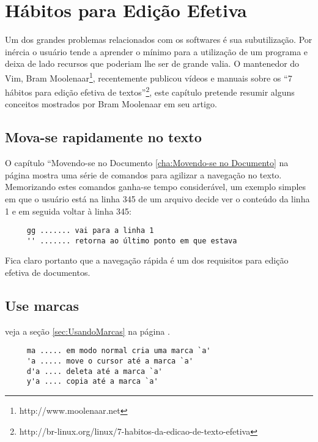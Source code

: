 
\chapter{Hábitos para Edição Efetiva}
\label{cha:Hábitos para edição efetiva}

Um dos grandes problemas relacionados com os softwares é sua subutilização. Por
inércia o usuário tende a aprender o mínimo para a utilização de um programa e
deixa de lado recursos que poderiam lhe ser de grande valia. O mantenedor do
Vim, Bram Moolenaar\footnote{http://www.moolenaar.net}, recentemente publicou
vídeos e manuais sobre os ``7 hábitos para edição efetiva de
textos''\footnote{http://br-linux.org/linux/7-habitos-da-edicao-de-texto-efetiva},
este capítulo pretende resumir alguns conceitos mostrados por Bram Moolenaar em
seu artigo.

\section{Mova-se rapidamente no texto}
\label{sec:Mova-se rapidamente no texto}

O capítulo ``Movendo-se no Documento \ref{cha:Movendo-se no Documento} na
página \pageref{cha:Movendo-se no Documento} mostra uma série de comandos para
agilizar a navegação no texto. Memorizando estes comandos ganha-se tempo
considerável, um exemplo simples em que o usuário está na linha 345 de um arquivo
decide ver o conteúdo da linha 1 e em seguida voltar à linha 345:

\begin{verbatim}
     gg ....... vai para a linha 1
     '' ....... retorna ao último ponto em que estava
\end{verbatim}

Fica claro portanto que a navegação rápida é um dos requisitos para edição
efetiva de documentos.


\section{Use marcas}
veja a seção \ref{sec:UsandoMarcas} na página \pageref{sec:UsandoMarcas}.

\begin{verbatim}
     ma ..... em modo normal cria uma marca `a'
     'a ..... move o cursor até a marca `a'
     d'a .... deleta até a marca `a'
     y'a .... copia até a marca `a'
\end{verbatim}



